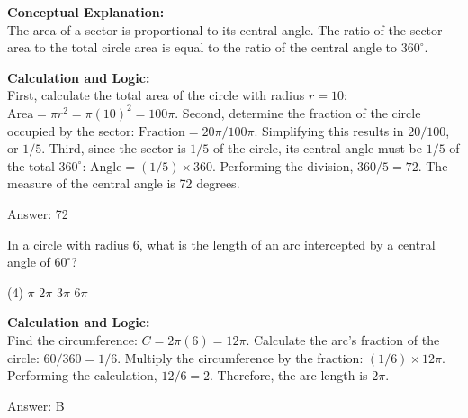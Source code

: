 \documentclass[11pt,paper=a4,answers]{exam}
\begin{document}
\begin{questions}
\begin{solution}
\textbf{Conceptual Explanation:} \\
The area of a sector is proportional to its central angle. The ratio of the sector area to the total circle area is equal to the ratio of the central angle to $360^\circ$.

\vspace{30pt}

\textbf{Calculation and Logic:} \\
First, calculate the total area of the circle with radius $r = 10$: $\text{Area} = \pi r^2 = \pi(10)^2 = 100\pi$. Second, determine the fraction of the circle occupied by the sector: $\text{Fraction} = 20\pi / 100\pi$. Simplifying this results in $20/100$, or $1/5$. Third, since the sector is $1/5$ of the circle, its central angle must be $1/5$ of the total $360^\circ$: $\text{Angle} = (1/5) \times 360$. Performing the division, $360 / 5 = 72$. The measure of the central angle is 72 degrees.

\vspace{30pt}

Answer: \colorbox{yellow!100}{72}
\end{solution}

\vspace{60pt}


\question
In a circle with radius 6, what is the length of an arc intercepted by a central angle of $60^\circ$?
\begin{tasks}(4)
    \task $\pi$
    \task $2\pi$
    \task $3\pi$
    \task $6\pi$
\end{tasks}

\begin{solution}
\textbf{Calculation and Logic:} \\
Find the circumference: $C = 2\pi(6) = 12\pi$. Calculate the arc's fraction of the circle: $60 / 360 = 1 / 6$. Multiply the circumference by the fraction: $(1/6) \times 12\pi$. Performing the calculation, $12 / 6 = 2$. Therefore, the arc length is $2\pi$.

\vspace{30pt}

Answer: \colorbox{yellow!100}{B}
\end{solution}

\vspace{60pt}


\end{questions}
\end{document}
